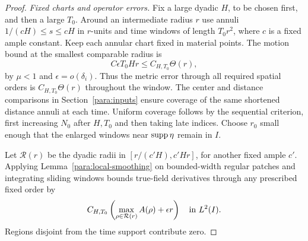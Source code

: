 \begin{proof}
\emph{Fixed charts and operator errors.}
Fix a large dyadic $H$, to be chosen first, and then a large $T_0$.
Around an intermediate radius $r$ use annuli
$1/(cH)\le s\le cH$ in $r$-units and time windows of length
$T_0r^2$, where $c$ is a fixed ample constant.  Keep each annular
chart fixed in material points.  The motion bound at the smallest
comparable radius is
\[
 C\epsilon T_0Hr\le C_{H,T_0}\Theta(r),
\]
by $\mu<1$ and $\epsilon=o(\delta_i)$.  Thus the metric error through
all required spatial orders is $C_{H,T_0}\Theta(r)$ throughout the
window.  The center and distance comparisons in
Section~\ref{para:inputs} ensure coverage of the same shortened
distance annuli at each time.  Uniform coverage follows by the
sequential criterion, first increasing $N_0$ after $H,T_0$ and then
taking late indices.  Choose $r_0$ small enough that the enlarged
windows near $\operatorname{supp}\eta$ remain in $I$.

Let $\mathcal R(r)$ be the dyadic radii in
$[r/(c'H),c'Hr]$, for another fixed ample $c'$.  Applying
Lemma~\ref{para:local-smoothing} on bounded-width regular patches
and integrating sliding windows bounds true-field derivatives
through any prescribed fixed order by
\begin{equation}
 C_{H,T_0}\left(\max_{\rho\in\mathcal R(r)}A(\rho)+\epsilon r\right)
 \quad\hbox{in }L^2(I).
 \label{para:true-field-bound}
\end{equation}
Regions disjoint from the time support contribute zero.


\end{proof}
